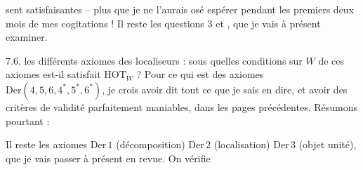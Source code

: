 %
%
sent satisfaisantes -- plus  que je ne l'aurais osé espérer pendant les premiers deux mois de mes cogitations ! Il reste les questions 3 et , que je vais à présent examiner.

7.6.  les différents axiomes des localiseurs : sous quelles conditions sur $W$  de ces axiomes est-il satisfait  $\mathrm{HOT}_W$ ? Pour ce qui est des axiomes $\mathrm{Der}(4,5,6,4^*,5^*,6^*)$, je crois avoir dit tout ce que je sais en dire, et avoir des critères de validité parfaitement maniables, dans les pages précédentes. Résumons pourtant :

Il reste les axiomes $\mathrm{Der}\,1$ (décomposition) $\mathrm{Der}\,2$ (localisation) $\mathrm{Der}\,3$ (objet unité), que je vais passer à présent en revue. On vérifie
